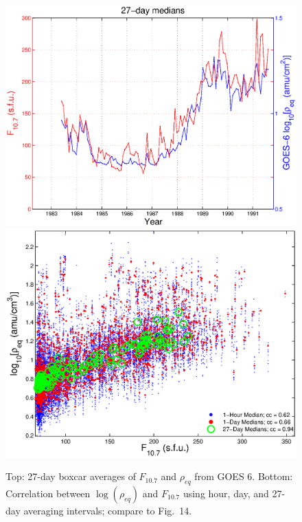 \documentclass[10pt,twocolumn]{article}
\begin{document}
\begin{figure}[htp!]
\centering
\includegraphics[scale=0.40]{paperfigures/F107MD27d-GOES6.eps}
\includegraphics[scale=0.40]{paperfigures/ccplot-GOES6.eps}
\caption{Top: 27-day boxcar averages of $F_{10.7}$ and $\rho_{eq}$ from GOES 6. Bottom: Correlation between $\log(\rho_{eq})$ and $F_{10.7}$ using hour, day, and 27-day averaging intervals; compare to \cite{Takahashi2010} Fig.~14.}
\label{ccplot}
\end{figure}
\clearpage
\end{document}

